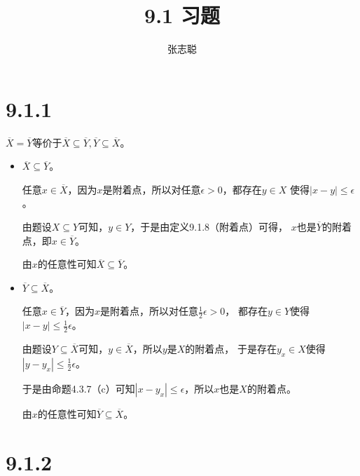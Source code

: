 \documentclass{article}
\begin{document}
\title{9.1 习题}
\author{张志聪}
\maketitle

\section*{9.1.1}

$\overline{X} = \overline{Y}$等价于$\overline{X} \subseteq \overline{Y}, \overline{Y} \subseteq \overline{X}$。

\begin{itemize}
      \item $\overline{X} \subseteq \overline{Y}$。

            任意$x \in \overline{X}$，因为$x$是附着点，所以对任意$\epsilon > 0$，都存在$y \in X$
            使得$|x - y| \leq \epsilon$。

            由题设$X \subseteq Y$可知，$y \in Y$，于是由定义9.1.8（附着点）可得，
            $x$也是$\overline{Y}$的附着点，即$x \in \overline{Y}$。

            由$x$的任意性可知$\overline{X} \subseteq \overline{Y}$。
      \item $\overline{Y} \subseteq \overline{X}$。

            任意$x \in \overline{Y}$，因为$x$是附着点，所以对任意$\frac{1}{2}\epsilon > 0$，
            都存在$y \in Y$使得$|x - y| \leq \frac{1}{2}\epsilon$。

            由题设$Y \subseteq \overline{X}$可知，$y \in \overline{X}$，所以$y$是$X$的附着点，
            于是存在$y_x \in X$使得$|y - y_x| \leq \frac{1}{2}\epsilon$。

            于是由命题4.3.7（c）可知$|x - y_x| \leq \epsilon$，所以$x$也是$X$的附着点。

            由$x$的任意性可知$\overline{Y} \subseteq \overline{X}$。
\end{itemize}

\section*{9.1.2}
\end{document}
